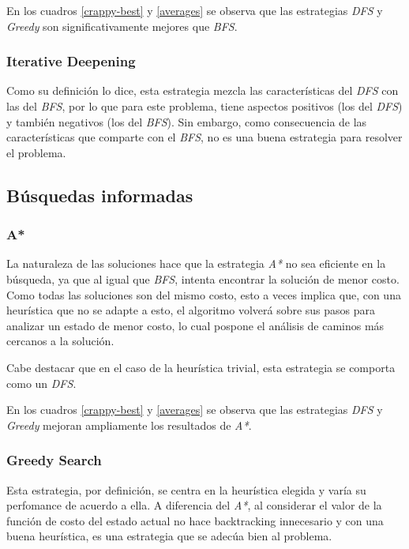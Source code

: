 \documentclass[a4paper,10pt]{article}
\begin{document}
\begin{itemize}
    En los cuadros \ref{crappy-best} y \ref{averages} se observa que las estrategias \textit{DFS} y \textit{Greedy} son significativamente mejores que \textit{BFS}.

    \subsubsection{Iterative Deepening}

    Como su definición lo dice, esta estrategia mezcla las características del \textit{DFS} con las del \textit{BFS}, por lo que para este problema, tiene aspectos positivos (los del \textit{DFS}) y también negativos (los del \textit{BFS}). Sin embargo, como consecuencia de las características que comparte con el \textit{BFS}, no es una buena estrategia para resolver el problema.

\subsection{Búsquedas informadas}
    
    \subsubsection{A*}
    
    La naturaleza de las soluciones hace que la estrategia \textit{A*} no sea eficiente en la búsqueda, ya que al igual que \textit{BFS}, intenta encontrar la solución de menor costo.
    Como todas las soluciones son del mismo costo, esto a veces implica que, con una heurística que no se adapte a esto, el algoritmo volverá sobre sus pasos para analizar un estado de menor costo, lo cual pospone el análisis de caminos más cercanos a la solución.

    Cabe destacar que en el caso de la heurística trivial, esta estrategia se comporta como un \textit{DFS}.

    En los cuadros \ref{crappy-best} y \ref{averages} se observa que las estrategias \textit{DFS} y \textit{Greedy} mejoran ampliamente los resultados de \textit{A*}.

    \subsubsection{Greedy Search}
    
    Esta estrategia, por definición, se centra en la heurística elegida y varía su perfomance de acuerdo a ella. A diferencia del \textit{A*}, al considerar el valor de la función de costo del estado actual no hace backtracking innecesario y con una buena heurística, es una estrategia que se adecúa bien al problema.


\end{itemize}
\end{document}

